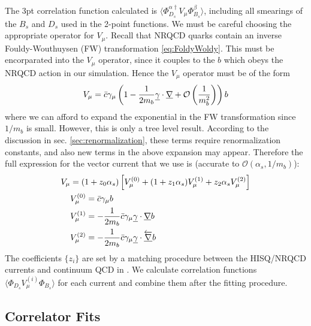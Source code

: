 The 3pt correlation function calculated is $\langle \Phi^{\alpha\dagger}_{D_s} V_{\mu} \Phi^{\beta}_{B_s} \rangle$, including all smearings of the $B_s$ and $D_s$ used in the 2-point functions. We must be careful choosing the appropriate operator for $V_{\mu}$. Recall that NRQCD quarks contain an inverse Fouldy-Wouthuysen (FW) transformation \eqref{eq:FoldyWoldy}. This must be encorparated into the $V_{\mu}$ operator, since it couples to the $b$ which obeys the NRQCD action in our simulation. Hence the $V_{\mu}$ operator must be of the form
\begin{align}
	V_{\mu} = \bar{c}\gamma_{\mu}\left( 1 - {1\over 2m_b} \underline{\gamma}\cdot\underline{\nabla} + \mathcal{O}\left({1\over m_b^2}\right) \right) b 
\end{align}
where we can afford to expand the exponential in the FW transformation since $1/m_b$ is small. However, this is only a tree level result. According to the discussion in sec. \ref{sec:renormalization}, these terms require renormalization constants, and also new terms in the above expansion may appear. Therefore the full expression for the vector current that we use is (accurate to $\mathcal{O}(\alpha_s,1/m_b)$):
\begin{align}
	\nonumber
	V_{\mu} &= (1+z_0 \alpha_s)\left[ V_{\mu}^{(0)} + (1 + z_1 \alpha_s) V_{\mu}^{(1)} + z_2 \alpha_s V_{\mu}^{(2)} \right] \\
	\nonumber
	& V_{\mu}^{(0)} = \bar{c}\gamma_{\mu} b \\
	\nonumber
	& V_{\mu}^{(1)} = -{1\over 2m_b} \bar{c} \gamma_{\mu}\underline{\gamma}\cdot\underline{\nabla} b \\
	\nonumber
	& V_{\mu}^{(2)} = -{1\over 2m_b} \bar{c} \gamma_{\mu}\underline{\gamma}\cdot\underline{\overleftarrow{\nabla}} b \\
	\label{eq:currentcorrections}
\end{align}
The coefficients $\{z_i\}$ are set by a matching procedure between the HISQ/NRQCD currents and continuum QCD in \cite{Monahan:2012dq}. We calculate correlation functions $\langle \Phi_{D_s} V^{(i)}_{\mu} \Phi_{B_s}\rangle$ for each current and combine them after the fitting procedure.

\subsection{Correlator Fits}

